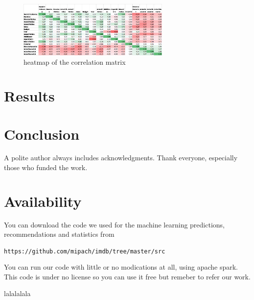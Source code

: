 \documentclass[letterpaper,twocolumn,10pt]{article}
\begin{document}
\bigskip

\begin{figure}
	
	\includegraphics[width=75mm,scale=0.3]{correlation_matrix_image}
	\caption{heatmap of the correlation matrix}
\end{figure}

\section{Results}

\section{Conclusion}

A polite author always includes acknowledgments.  Thank everyone,
especially those who funded the work. 

\section{Availability}

You can download the code we used for the machine learning predictions, recommendations and statistics from

\begin{center}
{\tt https://github.com/mipach/imdb/tree/master/src}\\
\end{center}

You can run our code with little or no modications at all, using apache spark. This code is under no license so you can use it free but remeber to refer our work.


{\footnotesize 
}
lalalalala
\end{document}
